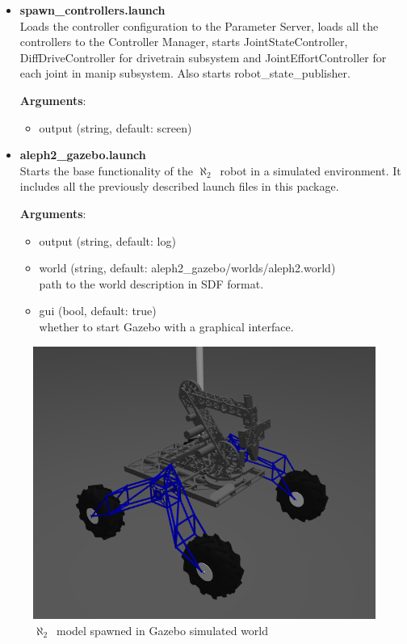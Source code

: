 \documentclass[english,inz,shortabstract]{iithesis}
\newcommand{\val}[1]{\textbf{\textsf{#1}}}
\newcommand{\rovername}{$\aleph_2$\ }
\begin{document}
\begin{itemize}
		\item \val{spawn\_controllers.launch}\\
		Loads the controller configuration to the Parameter Server, loads all the controllers to the Controller Manager, starts \textsf{JointStateController}, \textsf{DiffDriveController} for \textsf{drivetrain} subsystem and \textsf{JointEffortController} for each joint in \textsf{manip} subsystem. Also starts \textsf{robot\_state\_publisher}.

		\textbf{Arguments}:
		\begin{itemize}[itemsep=0pt, parsep=2pt, topsep=0pt]
			\item \textsf{output} (\textsf{string}, default: \textsf{screen})
		\end{itemize}

		\item \val{aleph2\_gazebo.launch}\\
		Starts the base functionality of the \rovername robot in a simulated environment. It includes all the previously described launch files in this package.

		\textbf{Arguments}:
		\begin{itemize}[itemsep=0pt, parsep=2pt, topsep=0pt]
			\item \textsf{output} (\textsf{string}, default: \textsf{log})
			\item \textsf{world} (\textsf{string}, default: \textsf{aleph2\_gazebo/worlds/aleph2.world})\\
			path to the world description in SDF format.
			\item \textsf{gui} (\textsf{bool}, default: \textsf{true})\\
			whether to start Gazebo with a graphical interface.
		\end{itemize}

	\end{itemize}

	\begin{figure}[ht]
		\centering
		\captionsetup{margin=2cm}
		\includegraphics[width=\textwidth]{img/gazebo.png}
		\caption{\rovername model spawned in Gazebo simulated world}
		\label{fig:gazebo}
	\end{figure}
\end{document}
